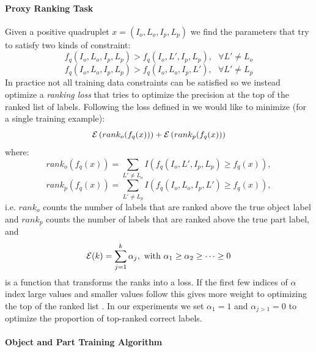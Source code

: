 \paragraph{Proxy Ranking Task}

Given a positive quadruplet  $x = (I_o,L_o,I_p,L_p)$ we find the parameters that try to satisfy two kinds of 
constraint:
\begin{equation} \label{con1}  
   f_q(I_o,L_o,I_p,L_p) > f_q(I_o,L',I_p,L_p), ~~~ \forall L' \neq L_o
\end{equation} 
\begin{equation} \label{con2}  
   f_q(I_o,L_o,I_p,L_p) > f_q(I_o,L_o,I_p,L'), ~~~ \forall L' \neq L_p
\end{equation} 
In practice not all training data constraints can be satisfied so we instead optimize a {\em ranking loss}
that tries to optimize the precision at the top of the ranked list of labels.
Following the loss defined in \cite{usunier,wsabie} 
we would like to minimize (for a single training example):
\[
   {\cal E} \left(rank_o(f_q(x))\right)  +    {\cal E} \left(rank_p(f_q(x))\right) 
\]
where:
\[
  rank_o(f_q(x)) =  \sum_{L' \neq L_o}  I( f_q(I_o,L',I_p,L_p) \geq f_q(x)),
\]
\[
  rank_p(f_q(x)) =  \sum_{L' \neq L_p}  I( f_q(I_o,L_o,I_p,L') \geq f_q(x)),
\]
i.e. $rank_o$ counts the number of labels that are ranked above the true object label 
and $rank_p$ counts the number of labels that are ranked above the true part label, and
\[
 {\cal E}(k)  =  \sum_{j=1}^k \alpha_j, \text{~with~} \alpha_1 \geq
 \alpha_2\geq \dots \geq 0
\]
is a function that transforms the ranks into a loss. 
If the first few indices of $\alpha$ index large values and smaller values follow this 
gives more weight to optimizing the top of the ranked list \cite{usunier}.
In our experiments we set  $\alpha_1=1$ and 
$\alpha_{j>1}=0$ to optimize the proportion of top-ranked correct labels.


\paragraph{Object and Part Training Algorithm}

